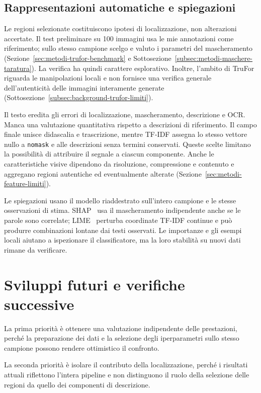 \subsection{Rappresentazioni automatiche e spiegazioni}
\label{subsec:limiti-rappresentazioni}

Le regioni selezionate costituiscono ipotesi di localizzazione, non alterazioni accertate. Il test preliminare su 100 immagini usa le mie annotazioni come riferimento; sullo stesso campione scelgo e valuto i parametri del mascheramento (Sezione~\ref{sec:metodi-trufor-benchmark} e Sottosezione~\ref{subsec:metodi-maschere-taratura}). La verifica ha quindi carattere esplorativo. Inoltre, l'ambito di TruFor riguarda le manipolazioni locali e non fornisce una verifica generale dell'autenticità delle immagini interamente generate (Sottosezione~\ref{subsec:background-trufor-limiti}).

Il testo eredita gli errori di localizzazione, mascheramento, descrizione e OCR. Manca una valutazione quantitativa rispetto a descrizioni di riferimento. Il campo finale unisce didascalia e trascrizione, mentre TF-IDF assegna lo stesso vettore nullo a \texttt{nomask} e alle descrizioni senza termini conservati. Queste scelte limitano la possibilità di attribuire il segnale a ciascun componente. Anche le caratteristiche visive dipendono da risoluzione, compressione e contenuto e aggregano regioni autentiche ed eventualmente alterate (Sezione~\ref{sec:metodi-feature-limiti}).

Le spiegazioni usano il modello riaddestrato sull'intero campione e le stesse osservazioni di stima. SHAP~\cite{NIPS2017_8a20a862} usa il mascheramento indipendente anche se le parole sono correlate; LIME~\cite{ribeiro2016whyitrustyou} perturba coordinate TF-IDF continue e può produrre combinazioni lontane dai testi osservati. Le importanze e gli esempi locali aiutano a ispezionare il classificatore, ma la loro stabilità su nuovi dati rimane da verificare.

\section{Sviluppi futuri e verifiche successive}
\label{sec:conclusioni-sviluppi}

La prima priorità è ottenere una valutazione indipendente delle prestazioni, perché la preparazione dei dati e la selezione degli iperparametri sullo stesso campione possono rendere ottimistico il confronto.

La seconda priorità è isolare il contributo della localizzazione, perché i risultati attuali riflettono l'intera pipeline e non distinguono il ruolo della selezione delle regioni da quello dei componenti di descrizione.

